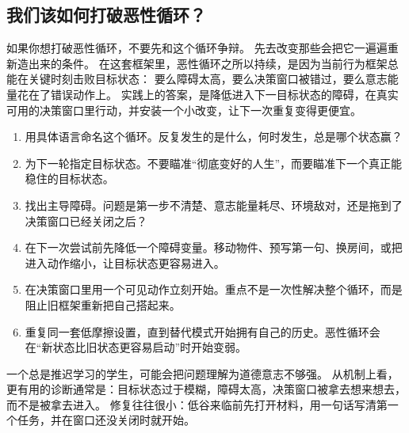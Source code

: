 \subsection{我们该如何打破恶性循环？}

如果你想打破恶性循环，不要先和这个循环争辩。
先去改变那些会把它一遍遍重新造出来的条件。
在这套框架里，恶性循环之所以持续，是因为当前行为框架总能在关键时刻击败目标状态：
要么障碍太高，要么决策窗口被错过，要么意志能量花在了错误动作上。
实践上的答案，是降低进入下一目标状态的障碍，在真实可用的决策窗口里行动，并安装一个小改变，让下一次重复变得更便宜。

\begin{enumerate}[nosep]
  \item 用具体语言命名这个循环。反复发生的是什么，何时发生，总是哪个状态赢？
  \item 为下一轮指定目标状态。不要瞄准“彻底变好的人生”，而要瞄准下一个真正能稳住的目标状态。
  \item 找出主导障碍。问题是第一步不清楚、意志能量耗尽、环境敌对，还是拖到了决策窗口已经关闭之后？
  \item 在下一次尝试前先降低一个障碍变量。移动物件、预写第一句、换房间，或把进入动作缩小，让目标状态更容易进入。
  \item 在决策窗口里用一个可见动作立刻开始。重点不是一次性解决整个循环，而是阻止旧框架重新把自己搭起来。
  \item 重复同一套低摩擦设置，直到替代模式开始拥有自己的历史。恶性循环会在“新状态比旧状态更容易启动”时开始变弱。
\end{enumerate}

\begin{remark}
一个总是推迟学习的学生，可能会把问题理解为道德意志不够强。
从机制上看，更有用的诊断通常是：目标状态过于模糊，障碍太高，决策窗口被拿去想来想去，而不是被拿去进入。
修复往往很小：低谷来临前先打开材料，用一句话写清第一个任务，并在窗口还没关闭时就开始。
\end{remark}